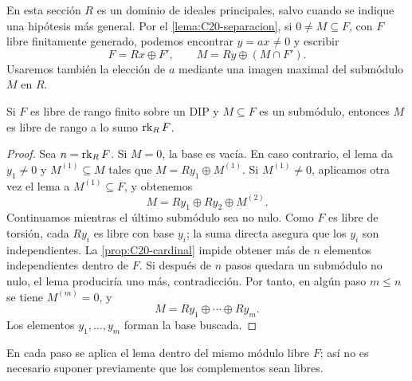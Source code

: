 En esta sección $R$ es un dominio de ideales principales, salvo cuando se indique una hipótesis más general. Por el \cref{lema:C20-separacion}, si $0\ne M\subseteq F$, con $F$ libre finitamente generado, podemos encontrar $y=ax\ne0$ y escribir
\[
F=Rx\oplus F',\qquad M=Ry\oplus(M\cap F').
\]
Usaremos también la elección de $a$ mediante una imagen maximal del submódulo $M$ en $R$.

\begin{prop}\label{prop:C21-submodulo-libre}
Si $F$ es libre de rango finito sobre un DIP y $M\subseteq F$ es un submódulo, entonces $M$ es libre de rango a lo sumo $\operatorname{rk}_R F$.
\end{prop}
\begin{proof}
Sea $n=\operatorname{rk}_R F$. Si $M=0$, la base es vacía. En caso contrario, el lema da $y_1\ne0$ y $M^{(1)}\subseteq M$ tales que $M=Ry_1\oplus M^{(1)}$. Si $M^{(1)}\ne0$, aplicamos otra vez el lema a $M^{(1)}\subseteq F$, y obtenemos
\[
M=Ry_1\oplus Ry_2\oplus M^{(2)}.
\]
Continuamos mientras el último submódulo sea no nulo. Como $F$ es libre de torsión, cada $Ry_i$ es libre con base $y_i$; la suma directa asegura que los $y_i$ son independientes. La \cref{prop:C20-cardinal} impide obtener más de $n$ elementos independientes dentro de $F$. Si después de $n$ pasos quedara un submódulo no nulo, el lema produciría uno más, contradicción. Por tanto, en algún paso $m\leq n$ se tiene $M^{(m)}=0$, y
\[
M=Ry_1\oplus\cdots\oplus Ry_m.
\]
Los elementos $y_1,\ldots,y_m$ forman la base buscada.
\end{proof}
En cada paso se aplica el lema dentro del mismo módulo libre $F$; así no es necesario suponer previamente que los complementos sean libres.


